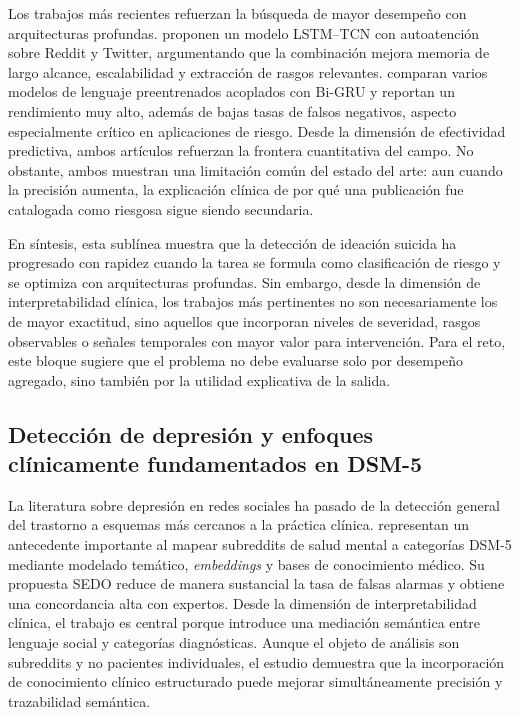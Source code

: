 Los trabajos más recientes refuerzan la búsqueda de mayor desempeño con arquitecturas profundas. \citet{mirtaheri2024tcn} proponen un modelo LSTM--TCN con autoatención sobre Reddit y Twitter, argumentando que la combinación mejora memoria de largo alcance, escalabilidad y extracción de rasgos relevantes. \citet{shuvo2024bigru} comparan varios modelos de lenguaje preentrenados acoplados con Bi-GRU y reportan un rendimiento muy alto, además de bajas tasas de falsos negativos, aspecto especialmente crítico en aplicaciones de riesgo. Desde la dimensión de efectividad predictiva, ambos artículos refuerzan la frontera cuantitativa del campo. No obstante, ambos muestran una limitación común del estado del arte: aun cuando la precisión aumenta, la explicación clínica de por qué una publicación fue catalogada como riesgosa sigue siendo secundaria.

En síntesis, esta sublínea muestra que la detección de ideación suicida ha progresado con rapidez cuando la tarea se formula como clasificación de riesgo y se optimiza con arquitecturas profundas. Sin embargo, desde la dimensión de interpretabilidad clínica, los trabajos más pertinentes no son necesariamente los de mayor exactitud, sino aquellos que incorporan niveles de severidad, rasgos observables o señales temporales con mayor valor para intervención. Para el reto, este bloque sugiere que el problema no debe evaluarse solo por desempeño agregado, sino también por la utilidad explicativa de la salida.

\subsection{Detección de depresión y enfoques clínicamente fundamentados en DSM-5}

La literatura sobre depresión en redes sociales ha pasado de la detección general del trastorno a esquemas más cercanos a la práctica clínica. \citet{gaur2018dsm5} representan un antecedente importante al mapear subreddits de salud mental a categorías DSM-5 mediante modelado temático, \textit{embeddings} y bases de conocimiento médico. Su propuesta SEDO reduce de manera sustancial la tasa de falsas alarmas y obtiene una concordancia alta con expertos. Desde la dimensión de interpretabilidad clínica, el trabajo es central porque introduce una mediación semántica entre lenguaje social y categorías diagnósticas. Aunque el objeto de análisis son subreddits y no pacientes individuales, el estudio demuestra que la incorporación de conocimiento clínico estructurado puede mejorar simultáneamente precisión y trazabilidad semántica.

